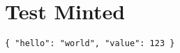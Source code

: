 \documentclass{article}
\begin{document}
\section{Test Minted}
\begin{verbatim}
{ "hello": "world", "value": 123 }
\end{verbatim}
\end{document}

